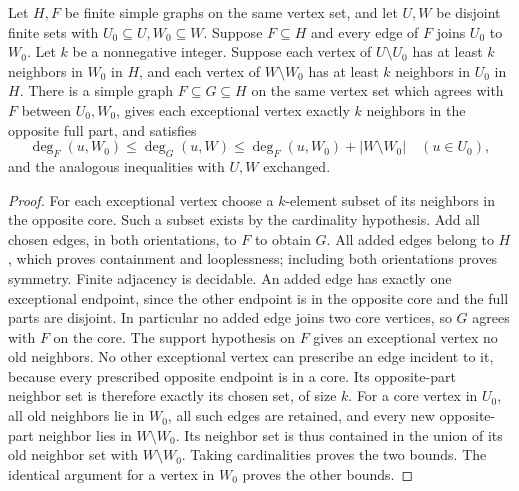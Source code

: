 \begin{lemma}
Let $H,F$ be finite simple graphs on the same vertex set, and let
$U,W$ be disjoint finite sets with $U_0\subseteq U,W_0\subseteq W$.
Suppose $F\subseteq H$ and every edge of $F$ joins $U_0$ to $W_0$.
Let $k$ be a nonnegative integer. Suppose each vertex of $U\setminus U_0$
has at least $k$ neighbors in $W_0$ in $H$, and each vertex of
$W\setminus W_0$ has at least $k$ neighbors in $U_0$ in $H$.
There is a simple graph $F\subseteq G\subseteq H$ on the same vertex set
which agrees with $F$ between $U_0,W_0$, gives each exceptional vertex
exactly $k$ neighbors in the opposite full part, and satisfies
\[
\deg_F(u,W_0)\leq\deg_G(u,W)\leq\deg_F(u,W_0)+|W\setminus W_0|
\quad(u\in U_0),
\]
and the analogous inequalities with $U,W$ exchanged.
\end{lemma}
\begin{proof}
For each exceptional vertex choose a $k$-element subset of its neighbors
in the opposite core. Such a subset exists by the cardinality hypothesis.
Add all chosen edges, in both orientations, to $F$ to obtain $G$.
All added edges belong to $H$, which proves containment and looplessness;
including both orientations proves symmetry. Finite adjacency is decidable.
An added edge has exactly one exceptional endpoint, since the other endpoint
is in the opposite core and the full parts are disjoint. In particular no
added edge joins two core vertices, so $G$ agrees with $F$ on the core.
The support hypothesis on $F$ gives an exceptional vertex no old neighbors.
No other exceptional vertex can prescribe an edge incident to it, because
every prescribed opposite endpoint is in a core. Its opposite-part neighbor
set is therefore exactly its chosen set, of size $k$.
For a core vertex in $U_0$, all old neighbors lie in $W_0$, all such edges
are retained, and every new opposite-part neighbor lies in $W\setminus W_0$.
Its neighbor set is thus contained in the union of its old neighbor set
with $W\setminus W_0$. Taking cardinalities proves the two bounds.
The identical argument for a vertex in $W_0$ proves the other bounds.
\end{proof}
